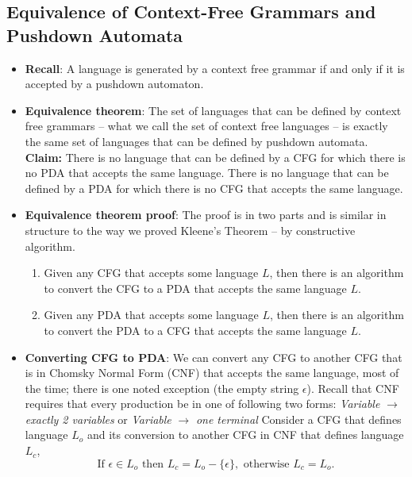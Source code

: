 \documentclass{report}
\begin{document}
    \subsection{Equivalence of Context-Free Grammars and Pushdown Automata}
    \begin{itemize}
        \item \textbf{Recall}: A language is generated by a context free grammar if and only if it is accepted by a pushdown automaton.
            \bigbreak \noindent 
        \item \textbf{Equivalence theorem}: The set of languages that can be defined by context free grammars – what we call the
            set of context free languages – is exactly the same set of languages that can be defined by pushdown
            automata.
            \bigbreak \noindent 
            \textbf{Claim:} There is no language that can be defined by a CFG for which there is no PDA that accepts the same language.
            \bigbreak \noindent 
            There is no language that can be defined by a PDA for which there is no CFG that accepts the same language.
        \item \textbf{Equivalence theorem proof}: The proof is in two parts and is similar in structure to the way
            we proved Kleene’s Theorem – by constructive algorithm.
            \begin{enumerate}
                \item Given any CFG that accepts some language $L$, then there is an algorithm to convert the CFG to a PDA that accepts the same language $L$.
                \item Given any PDA that accepts some language $L$, then there is an algorithm to convert the PDA to a CFG that accepts the same language $L$.
            \end{enumerate}
        \item \textbf{Converting CFG to PDA}: We can convert any CFG to another CFG that is in Chomsky Normal Form (CNF) that accepts the same language, most of the time; there is one noted exception (the empty string $\epsilon$).
            \bigbreak \noindent 
            Recall that CNF requires that every production be in one of following two forms: \textit{Variable} $\to$ \textit{exactly 2 variables} or \textit{Variable} $\to$ \textit{one terminal}
            \bigbreak \noindent 
            Consider a CFG that defines language \( L_o \) and its conversion to another CFG in CNF that defines language \( L_c \),
            \[
                \text{If } \epsilon \in L_o \text{ then } L_c = L_o - \{\epsilon\}, \text{ otherwise } L_c = L_o.
\]
\end{itemize}
\end{document}

